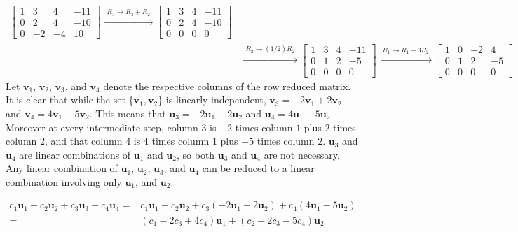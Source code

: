 \documentclass{article}
\begin{document}
\begin{itemize}
\begin{align*}
\begin{bmatrix}
1 &  3 &  4 & -11 \\
0 &  2 &  4 & -10 \\
0 & -2 & -4 & 10 
\end{bmatrix} \xrightarrow{\begin{array}{c} R_3 \rightarrow R_3 + R_2 \end{array}} \begin{bmatrix}
1 & 3 & 4 & -11 \\
0 & 2 & 4 & -10 \\
0 & 0 & 0 &    0 
\end{bmatrix} \\
& \xrightarrow{\begin{array}{c} R_2 \rightarrow (1/2)R_2 \end{array}} \begin{bmatrix}
1 & 3 & 4 & -11 \\
0 & 1 & 2 &  -5 \\
0 & 0 & 0 &    0 
\end{bmatrix} \xrightarrow{\begin{array}{c} R_1 \rightarrow R_1 - 3R_2 \end{array}} \begin{bmatrix}
1 & 0 & -2 &  4 \\
0 & 1 &  2 & -5 \\
0 & 0 &  0 &  0 
\end{bmatrix}
\end{align*}
Let \(\mathbf{v}_1\), \(\mathbf{v}_2\), \(\mathbf{v}_3\), and \(\mathbf{v}_4\) denote the respective columns of the row reduced matrix. It is clear that while the set \(\{\mathbf{v}_1, \mathbf{v}_2\}\) is linearly independent, \(\mathbf{v}_3 = -2\mathbf{v}_1 + 2\mathbf{v}_2\) and \(\mathbf{v}_4 = 4\mathbf{v}_1 - 5\mathbf{v}_2\). This means that \(\mathbf{u}_3 = -2\mathbf{u}_1 + 2\mathbf{u}_2\) and \(\mathbf{u}_4 = 4\mathbf{u}_1 - 5\mathbf{u}_2\). Moreover at every intermediate step, column \(3\) is \(-2\) times column \(1\) plus \(2\) times column \(2\), and that column \(4\) is \(4\) times column \(1\) plus \(-5\) times column \(2\). \(\mathbf{u}_3\) and \(\mathbf{u}_4\) are linear combinations of \(\mathbf{u}_1\) and \(\mathbf{u}_2\), so both \(\mathbf{u}_3\) and \(\mathbf{u}_4\) are not necessary. Any linear combination of \(\mathbf{u}_1\), \(\mathbf{u}_2\), \(\mathbf{u}_3\), and \(\mathbf{u}_4\) can be reduced to a linear combination involving only \(\mathbf{u}_1\), and \(\mathbf{u}_2\):

\begin{align*}   
c_1 \mathbf{u}_1 + c_2 \mathbf{u}_2 + c_3 \mathbf{u}_3 + c_4 \mathbf{u}_4 
= & c_1 \mathbf{u}_1 + c_2 \mathbf{u}_2 + c_3(-2\mathbf{u}_1 + 2\mathbf{u}_2) + c_4 (4\mathbf{u}_1 - 5\mathbf{u}_2) \\
= & (c_1 - 2c_3 + 4c_4)\mathbf{u}_1 + (c_2 + 2c_3 - 5c_4)\mathbf{u}_2
\end{align*}   


\end{itemize}
\end{document}
